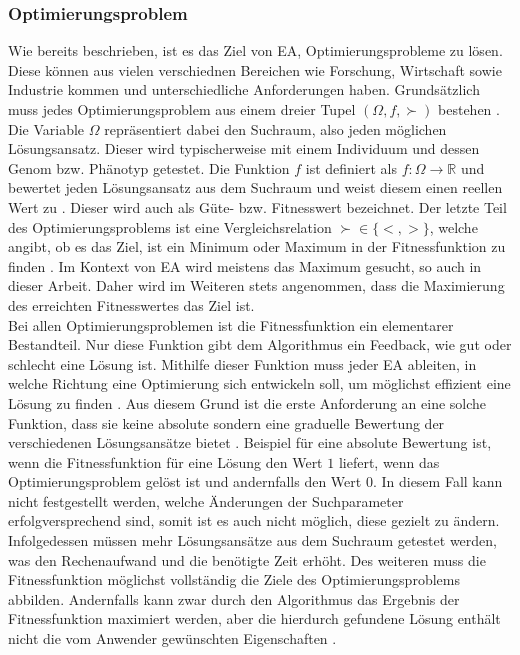 \subsubsection{Optimierungsproblem}
\label{subsub:optimzation_problem}
Wie bereits beschrieben, ist es das Ziel von \ac{EA}, Optimierungsprobleme zu lösen. Diese können aus vielen verschiednen Bereichen wie Forschung, Wirtschaft sowie Industrie kommen \cite{weicker2015evolutionare} und unterschiedliche Anforderungen haben. Grundsätzlich muss jedes Optimierungsproblem aus einem dreier Tupel $(\Omega, f, \succ)$ bestehen \cite{weicker2015evolutionare}. Die Variable $\Omega$ repräsentiert dabei den Suchraum, also jeden möglichen Lösungsansatz. Dieser wird typischerweise mit einem Individuum und dessen Genom bzw. Phänotyp getestet. Die Funktion $f$ ist definiert als $f: \Omega \rightarrow \mathbb{R}$ und bewertet jeden Lösungsansatz aus dem Suchraum und weist diesem einen reellen Wert zu \cite{weicker2015evolutionare}. Dieser wird auch als Güte- bzw. Fitnesswert bezeichnet. Der letzte Teil des Optimierungsproblems ist eine Vergleichsrelation $\succ \in \{<, >\}$, welche angibt, ob es das Ziel, ist ein Minimum oder Maximum in der Fitnessfunktion zu finden \cite{weicker2015evolutionare}. Im Kontext von \ac{EA} wird meistens das Maximum gesucht, so auch in dieser Arbeit. Daher wird im Weiteren stets angenommen, dass die Maximierung des erreichten Fitnesswertes das Ziel ist.\\
Bei allen Optimierungsproblemen ist die Fitnessfunktion ein elementarer Bestandteil. Nur diese Funktion gibt dem Algorithmus ein Feedback, wie gut oder schlecht eine Lösung ist. Mithilfe dieser Funktion muss jeder \ac{EA} ableiten, in welche Richtung eine Optimierung sich entwickeln soll, um möglichst effizient eine Lösung zu finden \cite{weicker2015evolutionare}. Aus diesem Grund ist die erste Anforderung an eine solche Funktion, dass sie keine absolute sondern eine graduelle Bewertung der verschiedenen Lösungsansätze bietet \cite{weicker2015evolutionare}. Beispiel für eine absolute Bewertung ist, wenn die Fitnessfunktion für eine Lösung den Wert $1$ liefert, wenn das Optimierungsproblem gelöst ist und andernfalls den Wert $0$. In diesem Fall kann nicht festgestellt werden, welche Änderungen der Suchparameter erfolgversprechend sind, somit ist es auch nicht möglich, diese gezielt zu ändern. Infolgedessen müssen mehr Lösungsansätze aus dem Suchraum getestet werden, was den Rechenaufwand und die benötigte Zeit erhöht. Des weiteren muss die Fitnessfunktion möglichst vollständig die Ziele des Optimierungsproblems abbilden. Andernfalls kann zwar durch den Algorithmus das Ergebnis der Fitnessfunktion maximiert werden, aber die hierdurch gefundene Lösung enthält nicht die vom Anwender gewünschten Eigenschaften \cite{weicker2015evolutionare}.

